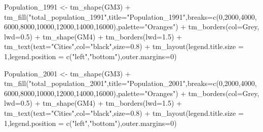 \documentclass[
]{article}
\newenvironment{Shaded}{\begin{snugshade}}{\end{snugshade}}
\newcommand{\AttributeTok}[1]{\textcolor[rgb]{0.77,0.63,0.00}{#1}}
\newcommand{\DecValTok}[1]{\textcolor[rgb]{0.00,0.00,0.81}{#1}}
\newcommand{\FloatTok}[1]{\textcolor[rgb]{0.00,0.00,0.81}{#1}}
\newcommand{\FunctionTok}[1]{\textcolor[rgb]{0.00,0.00,0.00}{#1}}
\newcommand{\NormalTok}[1]{#1}
\newcommand{\OtherTok}[1]{\textcolor[rgb]{0.56,0.35,0.01}{#1}}
\newcommand{\SpecialCharTok}[1]{\textcolor[rgb]{0.00,0.00,0.00}{#1}}
\newcommand{\StringTok}[1]{\textcolor[rgb]{0.31,0.60,0.02}{#1}}
\begin{document}
\begin{Shaded}
\begin{Highlighting}[]
\NormalTok{Population\_1991 }\OtherTok{\textless{}{-}} \FunctionTok{tm\_shape}\NormalTok{(GM3) }\SpecialCharTok{+}
  \FunctionTok{tm\_fill}\NormalTok{(}\StringTok{"total\_population\_1991"}\NormalTok{,}\AttributeTok{title=}\StringTok{"Population\_1991"}\NormalTok{,}\AttributeTok{breaks=}\FunctionTok{c}\NormalTok{(}\DecValTok{0}\NormalTok{,}\DecValTok{2000}\NormalTok{,}\DecValTok{4000}\NormalTok{,}\DecValTok{6000}\NormalTok{,}\DecValTok{8000}\NormalTok{,}\DecValTok{10000}\NormalTok{,}\DecValTok{12000}\NormalTok{,}\DecValTok{14000}\NormalTok{,}\DecValTok{16000}\NormalTok{),}\AttributeTok{palette=}\StringTok{"Oranges"}\NormalTok{) }\SpecialCharTok{+}
 \FunctionTok{tm\_borders}\NormalTok{(}\AttributeTok{col=}\StringTok{\textquotesingle{}Grey\textquotesingle{}}\NormalTok{, }\AttributeTok{lwd=}\FloatTok{0.5}\NormalTok{) }\SpecialCharTok{+}
\FunctionTok{tm\_shape}\NormalTok{(GM4) }\SpecialCharTok{+}
  \FunctionTok{tm\_borders}\NormalTok{(}\AttributeTok{lwd=}\FloatTok{1.5}\NormalTok{) }\SpecialCharTok{+}
  \FunctionTok{tm\_text}\NormalTok{(}\AttributeTok{text=}\StringTok{"Cities"}\NormalTok{,}\AttributeTok{col=}\StringTok{"black"}\NormalTok{,}\AttributeTok{size=}\FloatTok{0.8}\NormalTok{) }\SpecialCharTok{+}
\FunctionTok{tm\_layout}\NormalTok{(}\AttributeTok{legend.title.size =} \DecValTok{1}\NormalTok{,}\AttributeTok{legend.position =} \FunctionTok{c}\NormalTok{(}\StringTok{"left"}\NormalTok{,}\StringTok{"bottom"}\NormalTok{),}\AttributeTok{outer.margins=}\DecValTok{0}\NormalTok{)}

\NormalTok{Population\_2001 }\OtherTok{\textless{}{-}} \FunctionTok{tm\_shape}\NormalTok{(GM3) }\SpecialCharTok{+}
  \FunctionTok{tm\_fill}\NormalTok{(}\StringTok{"total\_population\_2001"}\NormalTok{,}\AttributeTok{title=}\StringTok{"Population\_2001"}\NormalTok{,}\AttributeTok{breaks=}\FunctionTok{c}\NormalTok{(}\DecValTok{0}\NormalTok{,}\DecValTok{2000}\NormalTok{,}\DecValTok{4000}\NormalTok{,}\DecValTok{6000}\NormalTok{,}\DecValTok{8000}\NormalTok{,}\DecValTok{10000}\NormalTok{,}\DecValTok{12000}\NormalTok{,}\DecValTok{14000}\NormalTok{,}\DecValTok{16000}\NormalTok{),}\AttributeTok{palette=}\StringTok{"Oranges"}\NormalTok{) }\SpecialCharTok{+}
 \FunctionTok{tm\_borders}\NormalTok{(}\AttributeTok{col=}\StringTok{\textquotesingle{}Grey\textquotesingle{}}\NormalTok{, }\AttributeTok{lwd=}\FloatTok{0.5}\NormalTok{) }\SpecialCharTok{+}
\FunctionTok{tm\_shape}\NormalTok{(GM4) }\SpecialCharTok{+}
  \FunctionTok{tm\_borders}\NormalTok{(}\AttributeTok{lwd=}\FloatTok{1.5}\NormalTok{) }\SpecialCharTok{+}
  \FunctionTok{tm\_text}\NormalTok{(}\AttributeTok{text=}\StringTok{"Cities"}\NormalTok{,}\AttributeTok{col=}\StringTok{"black"}\NormalTok{,}\AttributeTok{size=}\FloatTok{0.8}\NormalTok{) }\SpecialCharTok{+}
\FunctionTok{tm\_layout}\NormalTok{(}\AttributeTok{legend.title.size =} \DecValTok{1}\NormalTok{,}\AttributeTok{legend.position =} \FunctionTok{c}\NormalTok{(}\StringTok{"left"}\NormalTok{,}\StringTok{"bottom"}\NormalTok{),}\AttributeTok{outer.margins=}\DecValTok{0}\NormalTok{)}


\end{Highlighting}
\end{Shaded}
\end{document}
